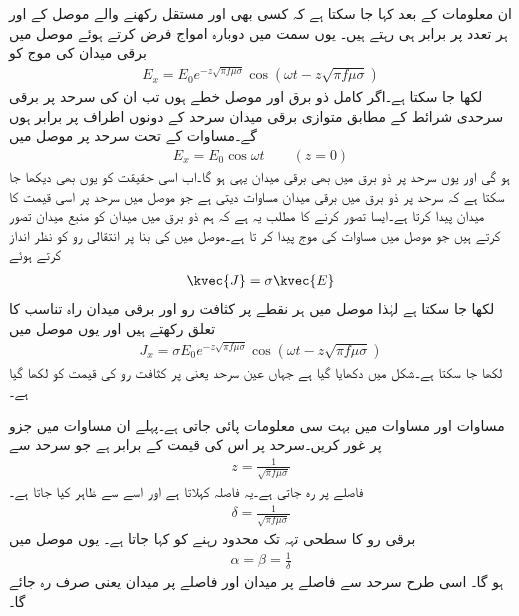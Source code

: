ان معلومات کے بعد کہا جا سکتا ہے کہ کسی بھی اور  مستقل رکھنے والے موصل کے  اور  ہر تعدد پر برابر ہی رہتے ہیں۔ یوں  سمت میں دوبارہ امواج فرض کرتے ہوئے موصل میں برقی میدان کی موج کو
\begin{align}\label{مساوات_موج_موصل_موج}
E_x=E_0 e^{-z \sqrt{\pi f \mu \sigma}} \cos (\omega t - z \sqrt{\pi f \mu \sigma})
\end{align}
لکھا جا سکتا ہے۔اگر  کامل ذو برق اور  موصل خطے ہوں تب ان کی سرحد  پر برقی سرحدی شرائط کے مطابق متوازی برقی میدان سرحد کے دونوں اطراف پر برابر ہوں گے۔مساوات  کے تحت سرحد پر موصل میں
\begin{align}\label{مساوات_موج_موصل_ذو_برق_سرحد_موج}
E_x=E_0  \cos \omega t \quad  \quad (z=0)
\end{align}
ہو گی اور یوں سرحد پر ذو برق میں بھی برقی میدان یہی ہو گا۔اب اسی حقیقت کو یوں بھی دیکھا جا سکتا ہے کہ سرحد پر ذو برق میں برقی میدان مساوات  دیتی ہے جو موصل میں سرحد پر اسی قیمت کا میدان پیدا کرتا ہے۔ایسا تصور کرنے کا مطلب یہ ہے کہ ہم ذو برق میں میدان کو منبع میدان تصور کرتے ہیں جو موصل میں مساوات  کی موج پیدا کر تا ہے۔موصل میں  کی بنا پر انتقالی رو کو نظر انداز کرتے ہوئے
\begin{align}
\kvec{J}=\sigma \kvec{E}
\end{align}
لکھا جا سکتا ہے لہٰذا موصل میں ہر نقطے پر کثافت رو اور برقی میدان راہ تناسب کا تعلق رکھتے ہیں اور یوں موصل میں
\begin{align}\label{مساوات_موج_موصل_کثافت_رو_موج}
J_x=\sigma E_0 e^{-z \sqrt{\pi f \mu \sigma}} \cos (\omega t - z \sqrt{\pi f \mu \sigma})
\end{align}
لکھا جا سکتا ہے۔شکل  میں  دکھایا گیا ہے جہاں عین سرحد یعنی  پر کثافت رو کی قیمت  کو  لکھا گیا ہے۔

مساوات  اور مساوات  میں بہت سی معلومات پائی جاتی ہے۔پہلے ان مساوات میں
   جزو پر غور کریں۔سرحد پر اس کی قیمت  کے برابر ہے جو سرحد سے
\begin{align*}
z=\frac{1}{\sqrt{\pi f \mu \sigma}}
\end{align*}
فاصلے پر  رہ جاتی ہے۔یہ فاصلہ  کہلاتا ہے  اور اسے   سے ظاہر کیا جاتا ہے۔
\begin{align}\label{مساوات_موج_گہرائی_جلد_تعریف}
\delta =\frac{1}{\sqrt{\pi f \mu \sigma}}
\end{align}
برقی رو کا سطحی تہہ تک محدود رہنے کو  کہا جاتا ہے۔
یوں موصل میں
\begin{align}\label{مساوات_موج_گہرائی_جلد_کے_تعلق}
\alpha=\beta=\frac{1}{\delta}
\end{align}
ہو گا۔
اسی طرح سرحد سے  فاصلے پر میدان  اور   فاصلے پر میدان  یعنی صرف  رہ جائے گا۔

